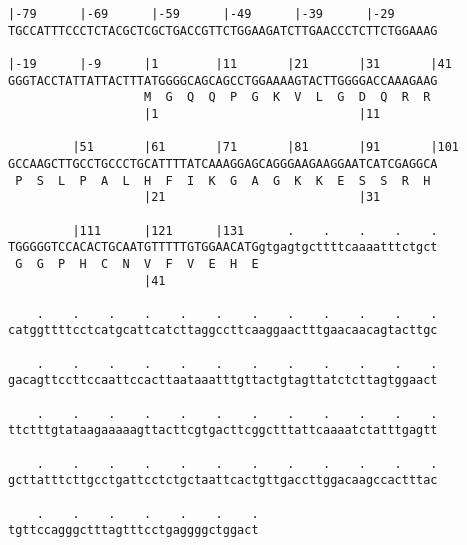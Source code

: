 \documentclass{article}
\begin{document}
\newpage
\begin{Verbatim}[fontfamily=courier]
|-79      |-69      |-59      |-49      |-39      |-29      
TGCCATTTCCCTCTACGCTCGCTGACCGTTCTGGAAGATCTTGAACCCTCTTCTGGAAAG

|-19      |-9      |1        |11       |21       |31       |41
GGGTACCTATTATTACTTTATGGGGCAGCAGCCTGGAAAAGTACTTGGGGACCAAAGAAG
                   M  G  Q  Q  P  G  K  V  L  G  D  Q  R  R 
                   |1                            |11        

         |51       |61       |71       |81       |91       |101
GCCAAGCTTGCCTGCCCTGCATTTTATCAAAGGAGCAGGGAAGAAGGAATCATCGAGGCA
 P  S  L  P  A  L  H  F  I  K  G  A  G  K  K  E  S  S  R  H 
                   |21                           |31        

         |111      |121      |131      .    .    .    .    .
TGGGGGTCCACACTGCAATGTTTTTGTGGAACATGgtgagtgcttttcaaaatttctgct
 G  G  P  H  C  N  V  F  V  E  H  E                         
                   |41                                      

    .    .    .    .    .    .    .    .    .    .    .    .
catggttttcctcatgcattcatcttaggccttcaaggaactttgaacaacagtacttgc

    .    .    .    .    .    .    .    .    .    .    .    .
gacagttccttccaattccacttaataaatttgttactgtagttatctcttagtggaact

    .    .    .    .    .    .    .    .    .    .    .    .
ttctttgtataagaaaaagttacttcgtgacttcggctttattcaaaatctatttgagtt

    .    .    .    .    .    .    .    .    .    .    .    .
gcttatttcttgcctgattcctctgctaattcactgttgaccttggacaagccactttac

    .    .    .    .    .    .    .
tgttccagggctttagtttcctgaggggctggact
\end{Verbatim}
\newpage
\end{document}
